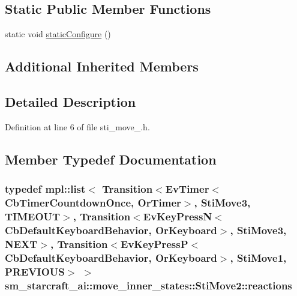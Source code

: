 \subsection*{Static Public Member Functions}
\begin{DoxyCompactItemize}
\item 
static void \hyperlink{structsm__starcraft__ai_1_1move__inner__states_1_1StiMove2_a5d2748899e99bf46ee3135d41ac1a33f}{static\+Configure} ()
\end{DoxyCompactItemize}
\subsection*{Additional Inherited Members}


\subsection{Detailed Description}


Definition at line 6 of file sti\+\_\+move\+\_.\+h.



\subsection{Member Typedef Documentation}
\subsubsection[{\texorpdfstring{reactions}{reactions}}]{\setlength{\rightskip}{0pt plus 5cm}typedef mpl\+::list$<$ Transition$<$Ev\+Timer$<$Cb\+Timer\+Countdown\+Once, {\bf Or\+Timer}$>$, {\bf Sti\+Move3}, {\bf T\+I\+M\+E\+O\+UT}$>$, Transition$<$Ev\+Key\+PressN$<$Cb\+Default\+Keyboard\+Behavior, {\bf Or\+Keyboard}$>$, {\bf Sti\+Move3}, {\bf N\+E\+XT}$>$, Transition$<$Ev\+Key\+PressP$<$Cb\+Default\+Keyboard\+Behavior, {\bf Or\+Keyboard}$>$, {\bf Sti\+Move1}, {\bf P\+R\+E\+V\+I\+O\+US}$>$ $>$ {\bf sm\+\_\+starcraft\+\_\+ai\+::move\+\_\+inner\+\_\+states\+::\+Sti\+Move2\+::reactions}}\hypertarget{structsm__starcraft__ai_1_1move__inner__states_1_1StiMove2_a8187cf9544687d15078665a7065c1360}{}\label{structsm__starcraft__ai_1_1move__inner__states_1_1StiMove2_a8187cf9544687d15078665a7065c1360}



